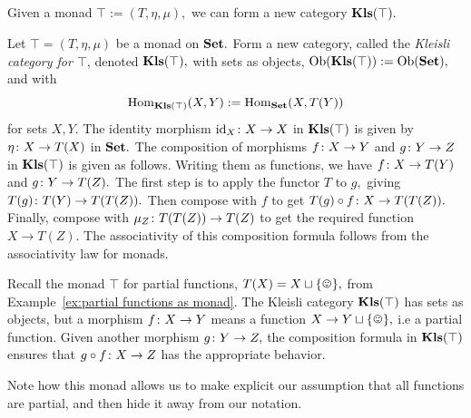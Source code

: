 \documentclass[../main/CT4S-EN-RU]{subfiles}
\begin{document}

\subsection{}\label{sec:kleisli}

\begin{blockENG}
Given a monad $\top:=(T,\eta,\mu),$ we can form a new category ${\mathbf{Kls}}(\top).$
\end{blockENG}

\begin{blockRUS}
\end{blockRUS}

\begin{definitionENG}\label{def:kleisli}
Let $\top=(T,\eta,\mu)$ be a monad on ${\mathbf{Set}}.$ Form a new category, called the {\em Kleisli category for $\top$}, denoted ${\mathbf{Kls}}(\top),$ with sets as objects, $\operatorname{Ob}({\mathbf{Kls}}(\top)):=\operatorname{Ob}({\mathbf{Set}}),$ and with $$\operatorname{Hom}_{{\mathbf{Kls}}(\top)}(X,Y):=\operatorname{Hom}_{\mathbf{Set}}(X,T(Y))$$ for sets $X,Y.$ The identity morphism $\operatorname{id}_X\colon X\rightarrow X$ in ${\mathbf{Kls}}(\top)$ is given by $\eta\colon X\rightarrow T(X)$ in ${\mathbf{Set}}.$ The composition of morphisms $f\colon X\rightarrow Y$ and $g\colon Y\rightarrow Z$ in ${\mathbf{Kls}}(\top)$ is given as follows. Writing them as functions, we have $f\colon X\rightarrow T(Y)$ and $g\colon Y\rightarrow T(Z).$ The first step is to apply the functor $T$ to $g,$ giving $T(g)\colon T(Y)\rightarrow T(T(Z)).$ Then compose with $f$ to get $T(g)\circ f\colon X\rightarrow T(T(Z)).$ Finally, compose with $\mu_Z\colon T(T(Z))\rightarrow T(Z)$ to get the required function $X\to T(Z).$ The associativity of this composition formula follows from the associativity law for monads.
\end{definitionENG}

\begin{definitionRUS}\label{def:kleisli}
\end{definitionRUS}

\begin{exampleENG}
Recall the monad $\top$ for partial functions, $T(X)=X\sqcup\singleton,$ from Example~\ref{ex:partial functions as monad}. The Kleisli category ${\mathbf{Kls}}(\top)$ has sets as objects, but a morphism $f\colon X\rightarrow Y$ means a function $X\to Y\sqcup\singleton,$ i.e a partial function. Given another morphism $g\colon Y\rightarrow Z,$ the composition formula in ${\mathbf{Kls}}(\top)$ ensures that $g\circ f\colon X\rightarrow Z$ has the appropriate behavior.

Note how this monad allows us to make explicit our assumption that all functions are partial, and then hide it away from our notation.
\end{exampleENG}
\end{document}
